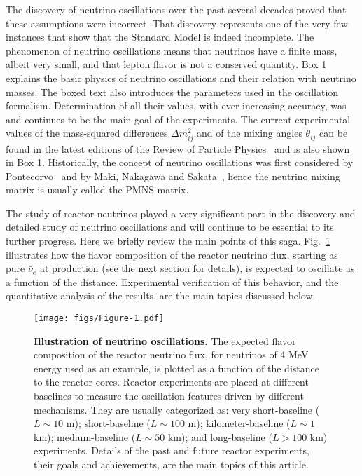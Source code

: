 \documentclass[aps,twocolumn,preprintnumbers,amsmath,superscriptaddress,amssymb,floats,nofootinbib]{revtex4-1}
\begin{document}
The discovery of neutrino oscillations over the past several decades
proved that these assumptions were incorrect. That discovery
represents one of the very few instances that show that 
the Standard Model is indeed incomplete. 
The phenomenon of neutrino oscillations means that
neutrinos have a finite mass, albeit very small, and that lepton flavor is not a conserved quantity.
Box 1 explains the basic physics of neutrino oscillations and their relation with neutrino masses. The boxed text
also introduces the parameters used in the oscillation formalism. Determination of all their values,
with ever increasing accuracy,
was and continues to be the main goal of the experiments.
The current experimental values of the mass-squared differences $\Delta m^2_{ij}$ and of the mixing angles $\theta_{ij}$ can be found
in the latest editions of the Review of Particle Physics~\cite{PDG14} and is also shown in Box 1.
Historically, the concept of neutrino oscillations was first considered by Pontecorvo~\cite{Pontecorvo57, Pontecorvo58}
and by Maki, Nakagawa and Sakata~\cite{MNS62}, hence the neutrino mixing matrix is usually called the PMNS matrix.

The study of reactor neutrinos played a very significant part in the discovery and detailed study of neutrino oscillations and will continue 
to be essential to its further progress. Here we briefly review
the main points of this saga. Fig.~\ref{fig:intro1} illustrates how the flavor composition of the reactor neutrino flux, starting as pure $\bar\nu_e$ at production (see the next section for details), is expected to oscillate as a function of the distance.
Experimental verification of this behavior, and the quantitative analysis of the results, are the main topics discussed below.

\begin{figure}[tb]
\begin{centering}
\texttt{[image: figs/Figure-1.pdf]}
\par\end{centering}
\caption{\label{fig:intro1} {\bf Illustration of neutrino oscillations.} The expected flavor composition of the reactor neutrino flux, for neutrinos of 4 MeV energy
used as an example, is plotted as a function of the distance to the reactor cores. Reactor experiments are placed at different baselines 
to measure the oscillation features driven by different mechanisms. They are usually categorized as: very short-baseline ($L\sim10$ m); short-baseline ($L\sim100$ m); kilometer-baseline ($L\sim1$ km); medium-baseline ($L\sim50$ km); and long-baseline ($L>100$ km) experiments. Details of the past and future reactor experiments, their goals and achievements, are the main topics of this article.
}
\end{figure}
\end{document}
